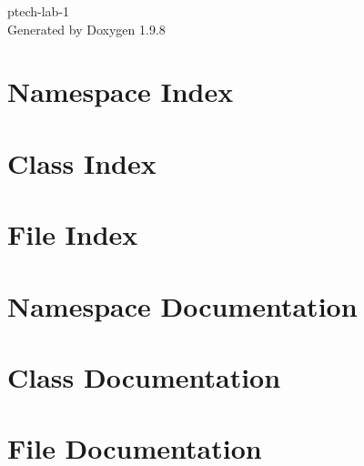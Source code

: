 \documentclass[twoside]{book}
\newcommand{\+}{\discretionary{\mbox{\scriptsize$\hookleftarrow$}}{}{}}
\newcommand{\clearemptydoublepage}{%
    \newpage{\pagestyle{empty}\cleardoublepage}%
  }
\begin{document}
  \raggedbottom
    \hypersetup{pageanchor=false,
                bookmarksnumbered=true,
                pdfencoding=unicode
               }
  \begin{titlepage}
  \vspace*{7cm}
  \begin{center}%
  {\Large ptech-\/lab-\/1}\\
  \vspace*{1cm}
  {\large Generated by Doxygen 1.9.8}\\
  \end{center}
  \end{titlepage}
  \clearemptydoublepage
  \tableofcontents
  \clearemptydoublepage
  \hypersetup{pageanchor=true}
\chapter{Namespace Index}

\chapter{Class Index}

\chapter{File Index}

\chapter{Namespace Documentation}


\chapter{Class Documentation}

\chapter{File Documentation}









  \backmatter
  \newpage
  \clearemptydoublepage
  \printindex
\end{document}

